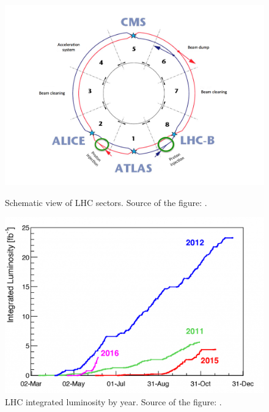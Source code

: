 \begin{figure}
\centering
\begin{minipage}{.48\textwidth}
  \centering
  \includegraphics[width=.95\linewidth]{../figs/Exp/LHC_sectors.png}
  \caption{Schematic view of LHC sectors. Source of the figure: \cite{ref_fig_LHCsectors}.}
  \label{fig:LHCsectors}
\end{minipage}%
\begin{minipage}{.48\textwidth}
  \centering
  \includegraphics[width=.95\linewidth]{../figs/Exp/LHC_lumi.png}
  \caption{LHC integrated luminosity by year. Source of the figure: \cite{ref_fig_LHClumi}.}
  \label{fig:LHClumi}
\end{minipage}
\end{figure}



